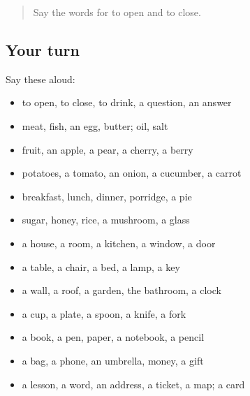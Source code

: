 \label{lesson:RU-R54-second-pass-food-the-house-and-things}



\begin{quote}
Say the words for to open and to close.
\end{quote}

\subsection*{Your turn}
Say these aloud:

\begin{itemize}
\raggedright
  \item to open, to close, to drink, a question, an answer
  \item meat, fish, an egg, butter; oil, salt
  \item fruit, an apple, a pear, a cherry, a berry
  \item potatoes, a tomato, an onion, a cucumber, a carrot
  \item breakfast, lunch, dinner, porridge, a pie
  \item sugar, honey, rice, a mushroom, a glass
  \item a house, a room, a kitchen, a window, a door
  \item a table, a chair, a bed, a lamp, a key
  \item a wall, a roof, a garden, the bathroom, a clock
  \item a cup, a plate, a spoon, a knife, a fork
  \item a book, a pen, paper, a notebook, a pencil
  \item a bag, a phone, an umbrella, money, a gift
  \item a lesson, a word, an address, a ticket, a map; a card
\end{itemize}

